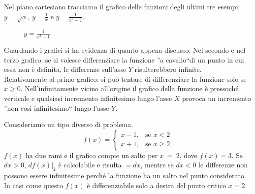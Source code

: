Nel piano cartesiano tracciamo il grafico delle funzioni degli ultimi 
tre esempi: $y=\sqrt{x}$, $y=\frac{1}{x}$ e $y=\frac{1}{x^2-1}$.
\begin{figure}[h]
\begin{inaccessibleblock}
 \begin{center}
 \begin{minipage}[]{.23 \textwidth}
  \vspace*{4mm} 
  \radice
  \vspace*{-5mm} 
  \caption{$y=\sqrt{x}$}
 \end{minipage} 
 \begin{minipage}[]{.37 \textwidth}
  \iperbole
  \caption{$y=\frac{1}{x}$}
 \end{minipage} 
 \begin{minipage}[]{.37 \textwidth}
  \iperbolequad
  \caption{$y=\frac{1}{x^2-1}$}
 \end{minipage}
 \end{center}
\end{inaccessibleblock}
\label{fig:diff01_grafici}
\end{figure}

Guardando i grafici si ha evidenza di quanto appena discusso.
Nel secondo e nel terzo grafico: se si volesse 
differenziare la funzione ''a cavallo``di un punto in cui essa non è 
definita, le differenze sull'asse \(Y\) risulterebbero infinite.\\
Relativamente al primo grafico: si può tentare di differenziare la funzione 
solo se \(x \ge 0\). Nell'infinitamente vicino all'origine il grafico della 
funzione è pressoché verticale e qualsiasi incremento infinitesimo lungo l'asse
\(X\) provoca un incremento ''non  così infinitesimo`` lungo l'asse \(Y\).

\begin{inaccessibleblock}
 \begin{center}
 \begin{minipage}[]{.38 \textwidth}
  \salto
 \end{minipage} 
 \hfill
 \begin{minipage}[]{.58 \textwidth}
Consideriamo un tipo diverso di problema.\\
\[f(x)=\begin{cases} 
x-1, & \mbox{se }x<2 \\ 
x+1, & \mbox{se }x\ge 2
\end{cases}
\]
$f(x)$ ha due rami e il grafico compie un salto per $x~=~2$, dove \(f(x)=3\).
Se \(dx>0\), \(df(x)|_2\) è calcolabile e risulta \(=dx\), mentre se \(dx<0\)
le differenze non possono essere infinitesime perché la funzione ha un salto 
nel 
punto considerato. In casi come questo $f(x)$ è differenziabile solo a destra 
del punto critico $x=2$.
 \end{minipage}
 \end{center}
\end{inaccessibleblock}
\label{fig:diff01_salto}



